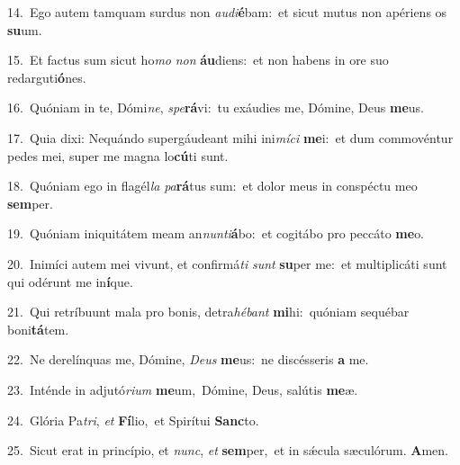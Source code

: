 {\numbfont\textcolor{\numbcolor}{14.}}~Ego autem tamquam surdus non \textit{au}\-\textit{di}\textbf{é}bam:~\star et sicut mutus non apériens os \textbf{su}\-um.\par
{\numbfont\textcolor{\numbcolor}{15.}}~Et factus sum sicut ho\textit{mo} \textit{non} \textbf{áu}\-diens:~\star et non habens in ore suo redarguti\-\textbf{ó}\-nes.\par
{\numbfont\textcolor{\numbcolor}{16.}}~Quóniam in te, Dómi\-\textit{ne}\-, \textit{spe}\-\textbf{rá}vi:~\star tu exáudies me, Dómine, Deus \textbf{me}\-us.\par
{\numbfont\textcolor{\numbcolor}{17.}}~Quia dixi: Nequándo supergáudeant mihi ini\-\textit{mí}\-\textit{ci} \textbf{me}\-i:~\star et dum commovéntur pedes mei, super me magna lo\-\textbf{cú}\-ti sunt.\par
{\numbfont\textcolor{\numbcolor}{18.}}~Quóniam ego in flagél\textit{la} \textit{pa}\-\textbf{rá}tus sum:~\star et dolor meus in conspéctu meo \textbf{sem}\-per.\par
{\numbfont\textcolor{\numbcolor}{19.}}~Quóniam iniquitátem meam an\-\textit{nun}\-\textit{ti}\textbf{á}bo:~\star et cogitábo pro peccáto \textbf{me}\-o.\par
{\numbfont\textcolor{\numbcolor}{20.}}~Inimíci autem mei vivunt, et confirmá\textit{ti} \textit{sunt} \textbf{su}\-per me:~\star et multiplicáti sunt qui odérunt me in\-\textbf{í}\-que.\par
{\numbfont\textcolor{\numbcolor}{21.}}~Qui retríbuunt mala pro bonis, detra\-\textit{hé}\-\textit{bant} \textbf{mi}\-hi:~\star quóniam sequébar boni\-\textbf{tá}\-tem.\par
{\numbfont\textcolor{\numbcolor}{22.}}~Ne derelínquas me, Dómine, \textit{De}\-\textit{us} \textbf{me}\-us:~\star ne discésseris \textbf{a} me.\par
{\numbfont\textcolor{\numbcolor}{23.}}~Inténde in adjutó\-\textit{ri}\-\textit{um} \textbf{me}\-um,~\star Dómine, Deus, salútis \textbf{me}\-æ.\par
{\numbfont\textcolor{\numbcolor}{24.}}~Glória Pa\-\textit{tri}\-, \textit{et} \textbf{Fí}\-lio,~\star et Spirítui \textbf{Sanc}\-to.\par
{\numbfont\textcolor{\numbcolor}{25.}}~Sicut erat in princípio, et \textit{nunc}\-, \textit{et} \textbf{sem}\-per,~\star et in sǽcula sæculórum. \textbf{A}\-men.\par
